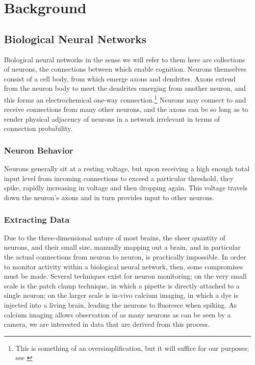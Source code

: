 \graphicspath{{resources/}}

\chapter{Background}

\section{Biological Neural Networks}
\label{sec:bioNN}
Biological neural networks in the sense we will refer to them  here are 
collections of neurons, the connections between which enable cognition. Neurons 
themselves consist of a cell body, from which emerge axons and dendrites. Axons 
extend from the neuron body to meet the dendrites emerging from another neuron, 
and this forms an electrochemical one-way connection.\footnote{This is something 
	of an oversimplification, but it will suffice for our purposes; see 
	\cite{Reimann2017}} Neurons may connect to and receive connections from many 
	other neurons, and the axons can be so long as to render physical adjacency 
	of neurons in a network irrelevant in terms of connection 
	probability.\cite{axonlens}

\subsection{Neuron Behavior}
Neurons generally sit at a resting voltage, but upon receiving a high enough 
total input level from incoming connections to exceed a particular threshold, 
they spike, rapidly increasing in voltage and then dropping again. 
\cite{actionpotential} This voltage travels down the neuron's axons and in turn 
provides input to other neurons.
\subsection{Extracting Data}
Due to the three-dimensional nature of most brains, the sheer quantity of 
neurons, and their small size, manually mapping out a brain, and in particular 
the actual connections from neuron to neuron, is practically impossible. In 
order to monitor activity within a biological neural network, then, some 
compromises must be made. Several techniques exist for neuron monitoring; on the 
very small scale is the patch clamp technique, in which a pipette is directly 
attached to a single neuron\cite{neher1992patch}; on the larger scale is in-vivo 
calcium imaging, in which a dye is injected into a living brain, leading the 
neurons to fluoresce when spiking\cite{Stosiek7319}. As calcium imaging allows 
observation of as many neurons as can be seen by a camera, we are interested in 
data that are derived from this process.

